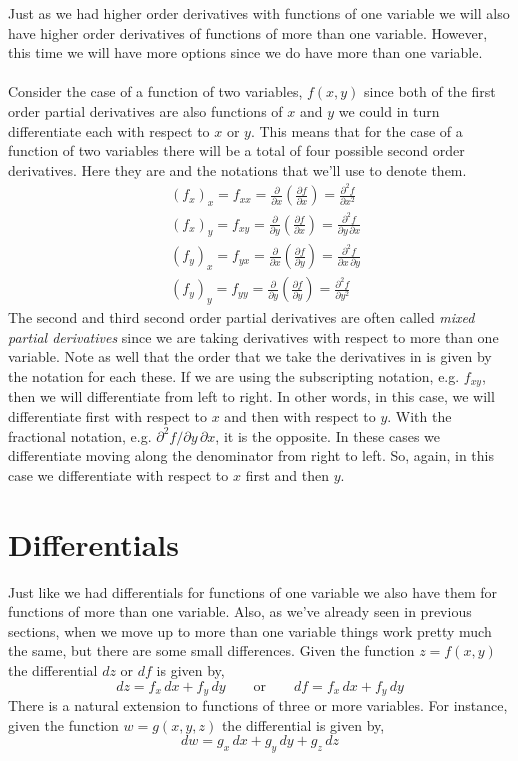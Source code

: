 \documentclass[10pt,reqno]{book}
\theoremstyle{definition}
\begin{document}
	Just as we had higher order derivatives with functions of one variable we will also have higher order derivatives of functions of more than one variable. However, this time we will have more options since we do have more than one variable.\\ \\
	Consider the case of a function of two variables, $ f(x,y) $ since both of the first order partial derivatives are also functions of $ x $ and $ y $ we could in turn differentiate each with respect to $ x $ or $ y $. This means that for the case of a function of two variables there will be a total of four possible second order derivatives. Here they are and the notations that we'll use to denote them.
	\begin{align*}
		& (f_x)_x = f_{xx} = \frac{\partial}{\partial x} \left(\frac{\partial f}{\partial x}\right) = \frac{\partial^2 f}{\partial x^2}\\
		& (f_x)_y = f_{xy} = \frac{\partial}{\partial y} \left(\frac{\partial f}{\partial x}\right) = \frac{\partial^2 f}{\partial y \, \partial x}\\
		& (f_y)_x = f_{yx} = \frac{\partial}{\partial x} \left(\frac{\partial f}{\partial y}\right) = \frac{\partial^2 f}{\partial x \, \partial y}\\
		& (f_y)_y = f_{yy} = \frac{\partial}{\partial y} \left(\frac{\partial f}{\partial y}\right) = \frac{\partial^2 f}{\partial y^2}
	\end{align*}
	The second and third second order partial derivatives are often called \textit{mixed partial derivatives} since we are taking derivatives with respect to more than one variable. Note as well that the order that we take the derivatives in is given by the notation for each these. If we are using the subscripting notation, e.g. $ f_{xy} $, then we will differentiate from left to right. In other words, in this case, we will differentiate first with respect to $ x $ and then with respect to $ y $. With the fractional notation, e.g. $ \partial^2 f / \partial y \, \partial x $, it is the opposite. In these cases we differentiate moving along the denominator from right to left. So, again, in this case we differentiate with respect to $ x $ first and then $ y $.
	
	\section{Differentials}
	
	 Just like we had differentials for functions of one variable we also have them for functions of more than one variable. Also, as we've already seen in previous sections, when we move up to more than one variable things work pretty much the same, but there are some small differences. Given the function $ z = f(x,y) $ the differential $ dz $ or $ df $ is given by,
	 \[ dz = f_x\,dx + f_y\,dy \qquad \text{or} \qquad df = f_x\,dx + f_y\,dy \]
	 There is a natural extension to functions of three or more variables. For instance, given the function $ w=g(x,y,z) $ the differential is given by,
	 \[ dw = g_x\,dx + g_y\,dy + g_z\,dz \]
	 
\end{document}
